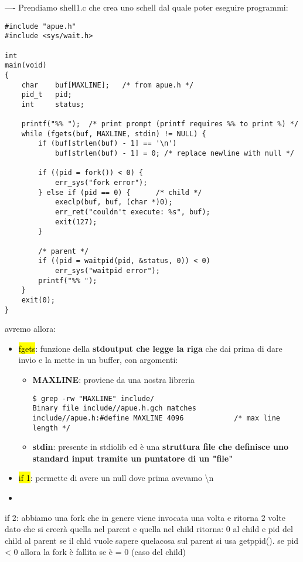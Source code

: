 ----
Prendiamo shell1.c che crea uno schell dal quale poter eseguire programmi:

\begin{lstlisting}
#include "apue.h"
#include <sys/wait.h>

int
main(void)
{
	char	buf[MAXLINE];	/* from apue.h */
	pid_t	pid;
	int		status;

	printf("%% ");	/* print prompt (printf requires %% to print %) */
	while (fgets(buf, MAXLINE, stdin) != NULL) {
		if (buf[strlen(buf) - 1] == '\n')
			buf[strlen(buf) - 1] = 0; /* replace newline with null */

		if ((pid = fork()) < 0) {
			err_sys("fork error");
		} else if (pid == 0) {		/* child */
			execlp(buf, buf, (char *)0);
			err_ret("couldn't execute: %s", buf);
			exit(127);
		}

		/* parent */
		if ((pid = waitpid(pid, &status, 0)) < 0)
			err_sys("waitpid error");
		printf("%% ");
	}
	exit(0);
}
\end{lstlisting}

avremo allora:

\begin{itemize}
	\item \hl{fgets}: funzione della \textbf{stdoutput che legge la riga} che dai prima di dare invio e la mette in un buffer, con argomenti:
	
		\begin{itemize}
			\item \textbf{MAXLINE}: proviene da una nostra libreria

\begin{lstlisting}
$ grep -rw "MAXLINE" include/
Binary file include//apue.h.gch matches
include//apue.h:#define	MAXLINE	4096			/* max line length */
\end{lstlisting}

			\item \textbf{stdin}: presente in stdiolib ed è una \textbf{struttura file che definisce uno standard input tramite un puntatore di un "file"}
		\end{itemize}

	\item \hl{if 1}: permette di avere un null dove prima avevamo \textbackslash n
	
	\item 
\end{itemize}



if 2: abbiamo una fork che in genere viene invocata una volta e ritorna 2 volte dato che si creerà quella nel parent e quella nel child ritorna: 0 al child e pid del child al parent se il chld vuole sapere quelacosa sul parent si usa getppid().
	se pid < 0 allora la fork è fallita
	se è = 0 (caso del child)
	
